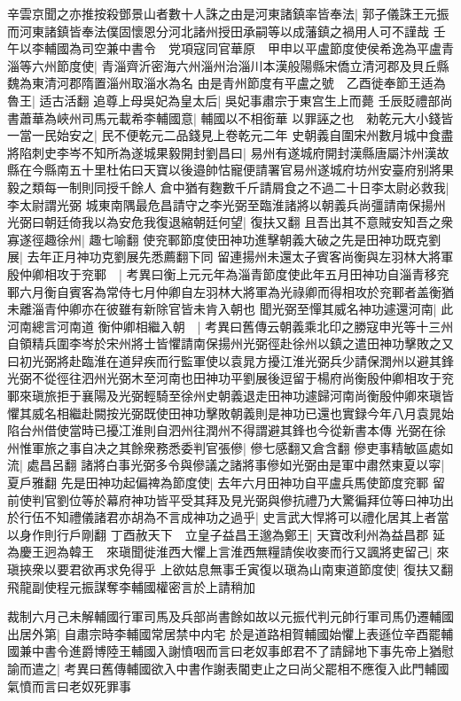 辛雲京聞之亦推按殺鄧景山者數十人誅之由是河東諸鎮率皆奉法|{
	郭子儀誅王元振而河東諸鎮皆奉法僕固懷恩分河北諸州授田承嗣等以成藩鎮之禍用人可不謹哉}
壬午以李輔國為司空兼中書令　党項寇同官華原　甲申以平盧節度使侯希逸為平盧青淄等六州節度使|{
	青淄齊沂密海六州淄州治淄川本漢般陽縣宋僑立清河郡及貝丘縣魏為東清河郡隋置淄州取淄水為名}
由是青州節度有平盧之號　乙酉徙奉節王适為魯王|{
	适古活翻}
追尊上母吳妃為皇太后|{
	吳妃事肅宗于東宫生上而薨}
壬辰貶禮部尚書蕭華為峽州司馬元載希李輔國意|{
	輔國以不相銜華}
以罪誣之也　勑乾元大小錢皆一當一民始安之|{
	民不便乾元二品錢見上卷乾元二年}
史朝義自圍宋州數月城中食盡將陷刺史李岑不知所為遂城果毅開封劉昌曰|{
	易州有遂城府開封漢縣唐屬汴州漢故縣在今縣南五十里杜佑曰天寶以後邉帥怙寵便請署官易州遂城府坊州安臺府别將果毅之類每一制則同授千餘人}
倉中猶有麴數千斤請屑食之不過二十日李太尉必救我|{
	李太尉謂光弼}
城東南隅最危昌請守之李光弼至臨淮諸將以朝義兵尚彊請南保揚州光弼曰朝廷倚我以為安危我復退縮朝廷何望|{
	復扶又翻}
且吾出其不意賊安知吾之衆寡遂徑趣徐州|{
	趣七喻翻}
使兖鄆節度使田神功進擊朝義大破之先是田神功既克劉展|{
	去年正月神功克劉展先悉薦翻下同}
留連揚州未還太子賓客尚衡與左羽林大將軍殷仲卿相攻于兖鄆　|{
	考異曰衡上元元年為淄青節度使此年五月田神功自淄青移兖鄆六月衡自賓客為常侍七月仲卿自左羽林大將軍為光祿卿而得相攻於兖鄆者盖衡猶未離淄青仲卿亦在彼雖有新除官皆未肯入朝也}
聞光弼至憚其威名神功遽還河南|{
	此河南總言河南道}
衡仲卿相繼入朝　|{
	考異曰舊傳云朝義乘北印之勝寇申光等十三州自領精兵圍李岑於宋州將士皆懼請南保揚州光弼徑赴徐州以鎮之遣田神功擊敗之又曰初光弼將赴臨淮在道舁疾而行監軍使以袁晁方擾江淮光弼兵少請保潤州以避其鋒光弼不從徑往泗州光弼木至河南也田神功平劉展後逗留于楊府尚衡殷仲卿相攻于兖鄆來瑱旅拒于襄陽及光弼輕騎至徐州史朝義退走田神功遽歸河南尚衡殷仲卿來瑱皆懼其威名相繼赴闕按光弼既使田神功擊敗朝義則是神功已還也實録今年八月袁晁始陷台州借使當時已擾冮淮則自泗州往潤州不得謂避其鋒也今從新書本傳}
光弼在徐州惟軍旅之事自决之其餘衆務悉委判官張傪|{
	傪七感翻又倉含翻}
傪吏事精敏區處如流|{
	處昌呂翻}
諸將白事光弼多令與傪議之諸將事傪如光弼由是軍中肅然東夏以寜|{
	夏戶雅翻}
先是田神功起偏禆為節度使|{
	去年六月田神功自平盧兵馬使節度兖鄆}
留前使判官劉位等於幕府神功皆平受其拜及見光弼與傪抗禮乃大驚徧拜位等曰神功出於行伍不知禮儀諸君亦胡為不言成神功之過乎|{
	史言武大悍將可以禮化居其上者當以身作則行戶剛翻}
丁酉赦天下　立皇子益昌王邈為鄭王|{
	天寶改利州為益昌郡}
延為慶王迥為韓王　來瑱聞徙淮西大懼上言淮西無糧請俟收麥而行又諷將吏留己|{
	來瑱挾衆以要君欲再求免得乎}
上欲姑息無事壬寅復以瑱為山南東道節度使|{
	復扶又翻}
飛龍副使程元振謀奪李輔國權密言於上請稍加

裁制六月己未解輔國行軍司馬及兵部尚書餘如故以元振代判元帥行軍司馬仍遷輔國出居外第|{
	自肅宗時李輔國常居禁中内宅}
於是道路相賀輔國始懼上表遜位辛酉罷輔國兼中書令進爵博陸王輔國入謝憤咽而言曰老奴事郎君不了請歸地下事先帝上猶慰諭而遣之|{
	考異曰舊傳輔國欲入中書作謝表閽吏止之曰尚父罷相不應復入此門輔國氣憤而言曰老奴死罪事}


